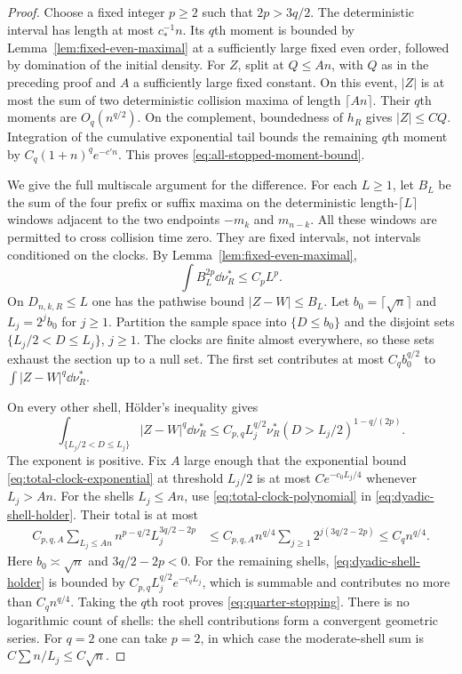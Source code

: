 \begin{proof}
Choose a fixed integer $p\ge2$ such that $2p>3q/2$. The deterministic
interval has length at most $c_*^{-1}n$. Its $q$th moment is bounded
by Lemma~\ref{lem:fixed-even-maximal} at a sufficiently large fixed
even order, followed by domination of the initial density.
For $Z$, split at $Q\le An$, with $Q$ as in the preceding proof and
$A$ a sufficiently large fixed constant. On this event, $|Z|$ is at
most the sum of two deterministic collision maxima of length
$\lceil An\rceil$. Their $q$th moments are $O_q(n^{q/2})$. On the
complement, boundedness of $h_R$ gives $|Z|\le C Q$. Integration of
the cumulative exponential tail bounds the remaining $q$th moment by
$C_q(1+n)^q e^{-c'n}$. This proves
\eqref{eq:all-stopped-moment-bound}.

We give the full multiscale argument for the difference. For each
$L\ge1$, let $B_L$ be the sum of the four prefix or suffix maxima
on the deterministic length-$\lceil L\rceil$ windows adjacent to
the two endpoints $-m_k$ and $m_{n-k}$. All these windows are permitted
to cross collision time zero. They are fixed intervals, not intervals
conditioned on the clocks. By Lemma~\ref{lem:fixed-even-maximal},
\begin{equation}\label{eq:deterministic-shell-maximal}
 \int B_L^{2p}\dd\nu_R^*\le C_p L^p.
\end{equation}
On $D_{n,k,R}\le L$ one has the pathwise bound
$|Z-W|\le B_L$. Let $b_0=\lceil\sqrt n\rceil$ and
$L_j=2^j b_0$ for $j\ge1$. Partition the sample space into
$\{D\le b_0\}$ and the disjoint sets
$\{L_j/2<D\le L_j\}$, $j\ge1$. The clocks are finite almost
everywhere, so these sets exhaust the section up to a null set.
The first set contributes at most $C_q b_0^{q/2}$ to
$\int|Z-W|^q\dd\nu_R^*$.

On every other shell, H\"older's inequality gives
\begin{equation}\label{eq:dyadic-shell-holder}
 \int_{\{L_j/2<D\le L_j\}}|Z-W|^q\dd\nu_R^*
 \le C_{p,q}L_j^{q/2}
       \nu_R^*(D>L_j/2)^{1-q/(2p)}.
\end{equation}
The exponent is positive. Fix $A$ large enough that the exponential
bound \eqref{eq:total-clock-exponential} at threshold $L_j/2$ is
at most $Ce^{-c_0L_j/4}$ whenever $L_j>An$.
For the shells $L_j\le An$, use
\eqref{eq:total-clock-polynomial} in
\eqref{eq:dyadic-shell-holder}. Their total is at most
\begin{align}
 C_{p,q,A}\sum_{L_j\le An} n^{p-q/2}L_j^{3q/2-2p}
 &\le C_{p,q,A}n^{q/4}
             \sum_{j\ge1}2^{j(3q/2-2p)}
 \le C_q n^{q/4}.
 \label{eq:dyadic-clock-summation}
\end{align}
Here $b_0\asymp\sqrt n$ and $3q/2-2p<0$. For the remaining shells,
\eqref{eq:dyadic-shell-holder} is bounded by
$C_{p,q}L_j^{q/2}e^{-c_qL_j}$, which is summable and contributes no
more than $C_qn^{q/4}$. Taking the $q$th root proves
\eqref{eq:quarter-stopping}. There is no logarithmic count of shells:
the shell contributions form a convergent geometric series. For $q=2$
one can take $p=2$, in which case the moderate-shell sum is
$C\sum n/L_j\le C\sqrt n$.


\end{proof}
